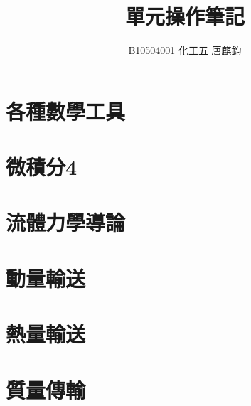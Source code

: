 \documentclass[12pt,a4paper]{article}
\title{單元操作筆記}
\author{B10504001 化工五 唐麒鈞}
\numberwithin{equation}{subsection}
\begin{document}
\pagestyle{plain}
\maketitle
\thispagestyle{empty}
\newpage
\tableofcontents
\newpage
\listoffigures
\newpage
\listoftables
\newpage
{}
\renewcommand{\headrule}{%
  \hrule width\headwidth height 0.4pt
  \vspace{2pt}
  {\footnotesize \hfill \rightmark}
}
\pagestyle{fancy}
\section{各種數學工具}


\section{微積分4}

\newpage
\section{流體力學導論}


\newpage
\section{動量輸送}






\newpage
\section{熱量輸送}






\newpage
\section{質量傳輸}








\newpage
\end{document}
